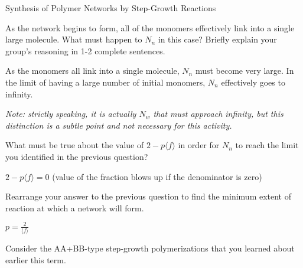 \begin{activity}[extension]{Synthesis of Polymer Networks by Step-Growth Reactions}
\begin{ctqs}
	\question As the network begins to form, all of the monomers effectively link into a single large molecule.  What must happen to $N_n$ in this case?  Briefly explain your group's reasoning in 1-2 complete sentences.
	
		\begin{solution}[1.5in]
			As the monomers all link into a single molecule, $N_n$ must become very large.  In the limit of having a large number of initial monomers, $N_n$ effectively goes to infinity.
			
			\emph{Note: strictly speaking, it is actually $N_w$ that must approach infinity, but this distinction is a subtle point and not necessary for this activity.}
		\end{solution}
	
	\question What must be true about the value of $2-p\langle f \rangle$ in order for $N_n$ to reach the limit you identified in the previous question?
	
		\begin{solution}[1.5in]
			$2-p\langle f\rangle = 0$ (value of the fraction blows up if the denominator is zero)
		\end{solution}
	
	\question Rearrange your answer to the previous question to find the minimum extent of reaction at which a network will form.
	
		\begin{solution}[1in]
			$p = \frac{2}{\langle f \rangle}$
		\end{solution}
\end{ctqs}


\begin{exercises}

	
	
	
	\exercise Consider the AA+BB-type step-growth polymerizations that you learned about earlier this term.
	

\end{exercises}
\end{activity}
